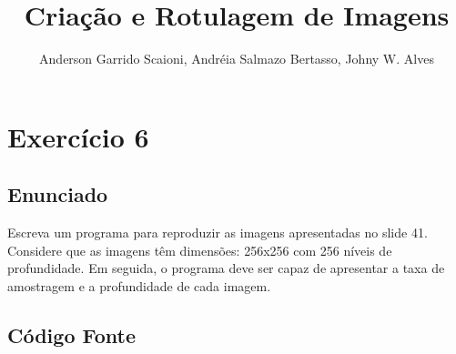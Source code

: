 \documentclass{article}
\title{Criação e Rotulagem de Imagens}
\author{Anderson Garrido Scaioni, Andréia Salmazo Bertasso, 
Johny W. Alves}
\begin{document}
\maketitle

\section{Exercício 6}

\subsection{Enunciado}

Escreva um programa para reproduzir as imagens apresentadas no slide 41. Considere que as imagens têm dimensões: 256x256 com 256 níveis de profundidade. Em seguida, o programa deve ser capaz de apresentar a taxa de amostragem e a profundidade de cada imagem.

\subsection{Código Fonte}
\end{document}
